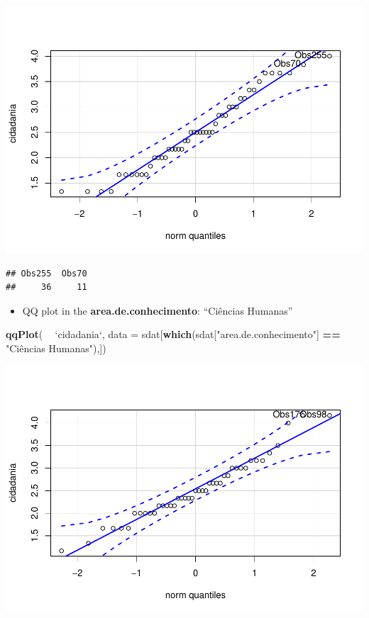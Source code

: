 \documentclass[]{article}
\newenvironment{Shaded}{\begin{snugshade}}{\end{snugshade}}
\newcommand{\DataTypeTok}[1]{\textcolor[rgb]{0.13,0.29,0.53}{#1}}
\newcommand{\KeywordTok}[1]{\textcolor[rgb]{0.13,0.29,0.53}{\textbf{#1}}}
\newcommand{\NormalTok}[1]{#1}
\newcommand{\OperatorTok}[1]{\textcolor[rgb]{0.81,0.36,0.00}{\textbf{#1}}}
\newcommand{\StringTok}[1]{\textcolor[rgb]{0.31,0.60,0.02}{#1}}
\providecommand{\tightlist}{%
  \setlength{\itemsep}{0pt}\setlength{\parskip}{0pt}}
\begin{document}
\includegraphics{factorialAnova_files/figure-latex/unnamed-chunk-25-1.pdf}

\begin{verbatim}
## Obs255  Obs70 
##     36     11
\end{verbatim}

\begin{itemize}
\tightlist
\item
  QQ plot in the \textbf{area.de.conhecimento}: ``Ciências Humanas''
\end{itemize}

\begin{Shaded}
\begin{Highlighting}[]
\KeywordTok{qqPlot}\NormalTok{( }\OperatorTok{~}\StringTok{ `}\DataTypeTok{cidadania}\StringTok{`}\NormalTok{, }\DataTypeTok{data =}\NormalTok{ sdat[}\KeywordTok{which}\NormalTok{(sdat[}\StringTok{"area.de.conhecimento"}\NormalTok{] }\OperatorTok{==}\StringTok{ "Ciências Humanas"}\NormalTok{),])}
\end{Highlighting}
\end{Shaded}

\includegraphics{factorialAnova_files/figure-latex/unnamed-chunk-26-1.pdf}
\end{document}
